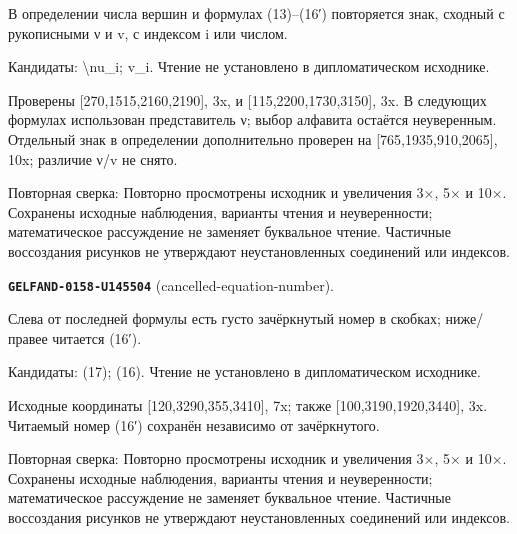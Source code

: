 В определении числа вершин и формулах (13)–(16′) повторяется знак, сходный с рукописными ν и v, с индексом i или числом.\par
Кандидаты: \textbackslash{}nu\_i; v\_i. Чтение не установлено в дипломатическом исходнике.\par
Проверены [270,1515,2160,2190], 3x, и [115,2200,1730,3150], 3x. В следующих формулах использован представитель ν; выбор алфавита остаётся неуверенным. Отдельный знак в определении дополнительно проверен на [765,1935,910,2065], 10x; различие ν/v не снято.\par
Повторная сверка: Повторно просмотрены исходник и увеличения 3×, 5× и 10×. Сохранены исходные наблюдения, варианты чтения и неуверенности; математическое рассуждение не заменяет буквальное чтение. Частичные воссоздания рисунков не утверждают неустановленных соединений или индексов.\par\medskip
\par\noindent\leavevmode{}\label{GELFAND-0158-U145504}\label{GELFAND-P001455:cancelled-equation-number}\textbf{\texttt{GELFAND-0158-U145504}} (cancelled-equation-number).\nopagebreak[4]\par
Слева от последней формулы есть густо зачёркнутый номер в скобках; ниже/правее читается (16′).\par
Кандидаты: (17); (16). Чтение не установлено в дипломатическом исходнике.\par
Исходные координаты [120,3290,355,3410], 7x; также [100,3190,1920,3440], 3x. Читаемый номер (16′) сохранён независимо от зачёркнутого.\par
Повторная сверка: Повторно просмотрены исходник и увеличения 3×, 5× и 10×. Сохранены исходные наблюдения, варианты чтения и неуверенности; математическое рассуждение не заменяет буквальное чтение. Частичные воссоздания рисунков не утверждают неустановленных соединений или индексов.\par\medskip
